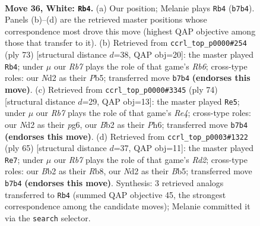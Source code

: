 \documentclass[11pt]{article}
\begin{document}
\clearpage

\begin{figure}[p]\centering
\begin{subfigure}{0.46\textwidth}\centering
\resizebox{\linewidth}{!}{%
\newchessgame
\chessboard[
  setfen={5k2/1R6/2p3p1/2r4p/5r1P/P7/1B1N2K1/8 w - - 0 36},
  showmover=false,
  pgfstyle=straightmove, color=movearrow, markmove={b7-b4}
]}
\caption{}
\end{subfigure}\hfill
\begin{subfigure}{0.46\textwidth}\centering
\resizebox{\linewidth}{!}{%
\newchessgame
\chessboard[
  setfen={6k1/8/3p4/pp5K/3RPP2/1r6/7P/8 b - - 0 37},
  showmover=false,
  pgfstyle=straightmove, color=movearrow, markmove={b3-b4}
]}
\caption{}
\end{subfigure}
\\[4pt]
\begin{subfigure}{0.46\textwidth}\centering
\resizebox{\linewidth}{!}{%
\newchessgame
\chessboard[
  setfen={r5k1/5p2/1R4pP/5r2/3PR3/8/5PK1/8 w - - 3 38},
  showmover=false,
  pgfstyle=straightmove, color=movearrow, markmove={e4-e5}
]}
\caption{}
\end{subfigure}\hfill
\begin{subfigure}{0.46\textwidth}\centering
\resizebox{\linewidth}{!}{%
\newchessgame
\chessboard[
  setfen={1r6/3r3p/5k2/1b6/p3R2P/R4B2/2P5/2K5 b - - 1 33},
  showmover=false,
  pgfstyle=straightmove, color=movearrow, markmove={d7-e7}
]}
\caption{}
\end{subfigure}
\caption{\textbf{Move 36, White: \texttt{Rb4}.} (a) Our position; Melanie plays \texttt{Rb4} (\texttt{b7b4}). Panels (b)--(d) are the retrieved master positions whose correspondence most drove this move (highest QAP objective among those that transfer to it). (b) Retrieved from \texttt{ccrl\_top\_p0000\#254} (ply 73) [structural distance $d$=38, QAP obj=20]: the master played \texttt{Rb4}; under $\mu$ our \emph{Rb7} plays the role of that game's \emph{Rb6}; cross-type roles: our \emph{N}d2 as their \emph{P}b5; transferred move \texttt{b7b4} \textbf{(endorses this move)}. (c) Retrieved from \texttt{ccrl\_top\_p0000\#3345} (ply 74) [structural distance $d$=29, QAP obj=13]: the master played \texttt{Re5}; under $\mu$ our \emph{Rb7} plays the role of that game's \emph{Re4}; cross-type roles: our \emph{N}d2 as their \emph{p}g6, our \emph{B}b2 as their \emph{P}h6; transferred move \texttt{b7b4} \textbf{(endorses this move)}. (d) Retrieved from \texttt{ccrl\_top\_p0003\#1322} (ply 65) [structural distance $d$=37, QAP obj=11]: the master played \texttt{Re7}; under $\mu$ our \emph{Rb7} plays the role of that game's \emph{Rd2}; cross-type roles: our \emph{B}b2 as their \emph{R}b8, our \emph{N}d2 as their \emph{B}b5; transferred move \texttt{b7b4} \textbf{(endorses this move)}. Synthesis: 3 retrieved analogs transferred to \texttt{Rb4} (summed QAP objective 45, the strongest correspondence among the candidate moves); Melanie committed it via the \texttt{search} selector.}
\label{fig:thought-m70}
\end{figure}
\end{document}

